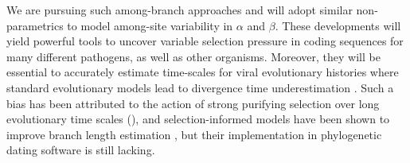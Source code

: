 We are pursuing such among-branch approaches and will adopt similar non-parametrics to model among-site variability in $\alpha$ and $\beta$. These developments will yield powerful tools to uncover variable selection pressure in coding sequences for many different pathogens, as well as other organisms.
Moreover, they will be essential to accurately estimate time-scales for viral evolutionary histories where standard evolutionary models lead to divergence time underestimation \citep{wertheim11}. Such a bias has been attributed to the action of strong purifying selection over long evolutionary time scales (), and selection-informed models have been shown to improve branch length estimation \citep{wertheim11}, but their implementation in phylogenetic dating software is still lacking.




